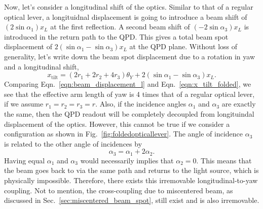 Now, let's consider a longitudinal shift of the optics.
Similar to that of a regular optical lever, a longituidnal displacement is going to introduce a beam shift of $\left(2\sin\alpha_1\right)x_L$ at the first reflection.
A second beam shift of $\left(-2\sin\alpha_3\right)x_L$ is introduced in the return path to the QPD.
This gives a total beam spot displacement of $2\left(\sin\alpha_1-\sin\alpha_3\right)x_L$ at the QPD plane.
Without loss of generality, let's write down the beam spot displacement due to a rotation in yaw and a longitudinal shift,
\begin{equation}
	x_\mathrm{tilt} = \left(2r_1+2r_2+4r_3\right)\theta_Y + 2\left(\sin\alpha_1-\sin\alpha_3\right)x_L.
	\label{eqn:x_tilt_folded}
\end{equation}
Comparing Eqn.~\eqref{eqn:beam_displacement_l} and Eqn.~\eqref{eqn:x_tilt_folded}, we see that the effective arm length of yaw is 4 times that of a regular optical lever, if we assume $r_1=r_2=r_3=r$.
Also, if the incidence angles $\alpha_1$ and $\alpha_3$ are exactly the same, then the QPD readout will be completely decoupled from longituindal displacement of the optics.
However, this cannot be true if we consider a configuration as shown in Fig.~\ref{fig:foldedopticallever}.
The angle of incidence $\alpha_3$ is related to the other angle of incidences by
\begin{equation}
	\alpha_3 = \alpha_1+2\alpha_2.
\end{equation}
Having equal $\alpha_1$ and $\alpha_3$ would necessarily implies that $\alpha_2=0$.
This means that the beam goes back to via the same path and returns to the light source, which is physically impossible.
Therefore, there exists this irremovable longitudinal-to-yaw coupling.
Not to mention, the cross-coupling due to miscentered beam, as discussed in Sec.~\ref{sec:miscentered_beam_spot}, still exist and is also irremovable.

